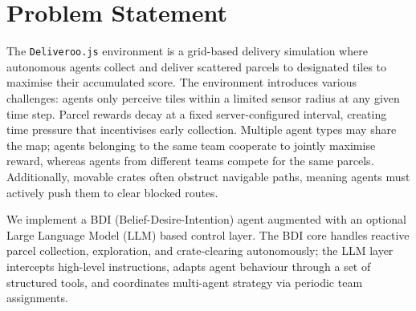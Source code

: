 \section{Problem Statement}

The \texttt{Deliveroo.js} environment is a grid-based delivery simulation where autonomous agents collect and deliver scattered parcels to designated tiles to maximise their accumulated score. 
The environment introduces various challenges: agents only perceive tiles within a limited sensor radius at any given time step. 
Parcel rewards decay at a fixed server-configured interval, creating time pressure that incentivises early collection.
Multiple agent types may share the map; agents belonging to the same team cooperate to jointly maximise reward, whereas agents from different teams compete for the same parcels. 
Additionally, movable crates often obstruct navigable paths, meaning agents must actively push them to clear blocked routes.

We implement a BDI (Belief-Desire-Intention) agent augmented with an optional Large Language Model (LLM) based control layer. 
The BDI core handles reactive parcel collection, exploration, and crate-clearing autonomously; the LLM layer intercepts high-level instructions, 
adapts agent behaviour through a set of structured tools, and coordinates multi-agent strategy via periodic team assignments.
